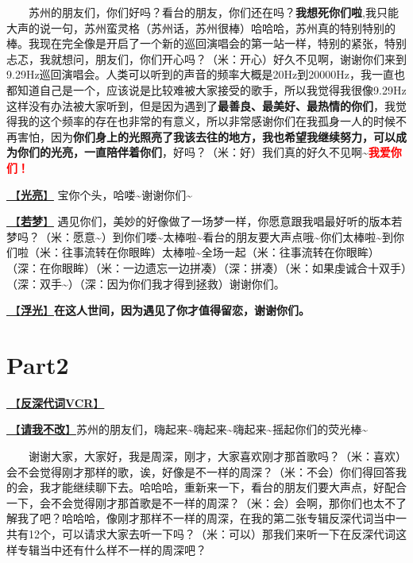\documentclass[]{ctexbook}
\begin{document}
  苏州的朋友们，你们好吗？看台的朋友，你们还在吗？\textbf{我想死你们啦},我只能大声的说一句，苏州蛮灵格（苏州话，苏州很棒）哈哈哈，苏州真的特别特别的棒。我现在完全像是开启了一个新的巡回演唱会的第一站一样，特别的紧张，特别忐忑，我就想问，朋友们，你们开心吗？（米：开心）好久不见啊，谢谢你们来到9.29Hz巡回演唱会。人类可以听到的声音的频率大概是20Hz到20000Hz，我一直也都知道自己是一个，应该说是比较难被大家接受的歌手，所以我觉得我很像9.29Hz这样没有办法被大家听到，但是因为遇到了\textbf{最善良、最美好、最热情的你们}，我觉得我的这个频率的存在也非常的有意义，所以非常感谢你们在我孤身一人的时候不再害怕，因为\textbf{你们身上的光照亮了我该去往的地方，我也希望我继续努力，可以成为你们的光亮，一直陪伴着你们}，好吗？（米：好）我们真的好久不见啊\textasciitilde{}\textbf{\textcolor{red}{我爱你们！}}

\hyperref[silver-linings]{🎵【\textbf{光亮}】} 宝你个头，哈喽\textasciitilde 谢谢你们\textasciitilde{}

\hyperref[ruomeng]{🎵【\textbf{若梦}】} 遇见你们，美妙的好像做了一场梦一样，你愿意跟我唱最好听的版本若梦吗？（米：愿意\textasciitilde）到你们喽\textasciitilde 太棒啦\textasciitilde 看台的朋友要大声点哦\textasciitilde 你们太棒啦\textasciitilde 到你们啦（米：往事流转在你眼眸）太棒啦\textasciitilde 全场一起（米：往事流转在你眼眸）（深：在你眼眸）（米：一边遗忘一边拼凑）（深：拼凑）（米：如果虔诚合十双手）（深：双手\textasciitilde）（深：因为你们我才得到拯救）谢谢你们。

\hyperref[floating-light]{🎵【\textbf{浮光}】}\textbf{在这人世间，因为遇见了你才值得留恋，谢谢你们。}

\section{Part2}\label{suzhou-20241109-part2}

\hyperref[senself-vcr]{🎥【\textbf{反深代词VCR}】}

\hyperref[brave-heart]{🎵【\textbf{请我不改}】}苏州的朋友们，嗨起来\textasciitilde 嗨起来\textasciitilde 嗨起来\textasciitilde 摇起你们的荧光棒\textasciitilde{}

  谢谢大家，大家好，我是周深，刚才，大家喜欢刚才那首歌吗？（米：喜欢）会不会觉得刚才那样的歌，诶，好像是不一样的周深？（米：不会）你们得回答我的会，我才能继续聊下去。哈哈哈，重新来一下，看台的朋友们要大声点，好配合一下，会不会觉得刚才那首歌是不一样的周深？（米：会）会啊，那你们也太不了解我了吧？哈哈哈，像刚才那样不一样的周深，在我的第二张专辑反深代词当中一共有12个，可以请求大家去听一下吗？（米：可以）那我们来听一下在反深代词这样专辑当中还有什么样不一样的周深吧？
\end{document}
